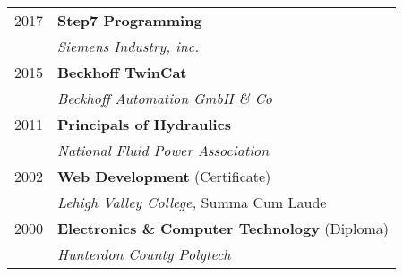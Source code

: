 \documentclass[10pt]{article} %
\begin{document}
\begin{minipage}[t]{0.44\textwidth}
\begin{tabular}{rl} %
2017 & \textbf{Step7 Programming}\\
    & \textit{Siemens Industry, inc.}\\
2015 & \textbf{Beckhoff TwinCat}\\
    & \textit{Beckhoff Automation GmbH \& Co}\\
2011 & \textbf{Principals of Hydraulics} \\ 
& \textit{National Fluid Power Association}\\
2002 & \textbf{Web Development} \footnotesize(Certificate) \\ 
	& \textit{Lehigh Valley College,} \footnotesize Summa Cum Laude\\
2000 & \textbf{Electronics \& Computer Technology} \footnotesize(Diploma)\\
& \textit{Hunterdon County Polytech}\\

	 
\end{tabular}

\end{minipage} %

\end{document}

